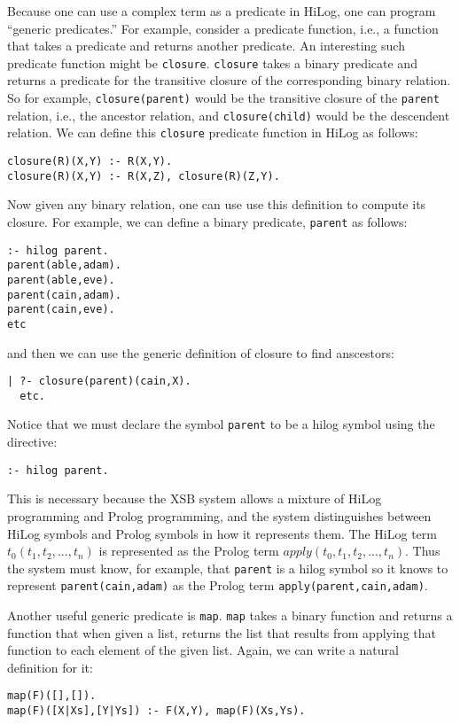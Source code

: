 Because one can use a complex term as a predicate in HiLog, one can
program ``generic predicates.''  For example, consider a predicate
function, i.e., a function that takes a predicate and returns another
predicate.  An interesting such predicate function might be
\verb|closure|.  \verb|closure| takes a binary predicate and returns a
predicate for the transitive closure of the corresponding binary
relation.  So for example, \verb|closure(parent)| would be the
transitive closure of the \verb|parent| relation, i.e., the ancestor
relation, and \verb|closure(child)| would be the descendent relation.
We can define this \verb|closure| predicate function in HiLog as
follows:
\begin{verbatim}
closure(R)(X,Y) :- R(X,Y).
closure(R)(X,Y) :- R(X,Z), closure(R)(Z,Y).
\end{verbatim}
Now given any binary relation, one can use use this definition to
compute its closure.  For example, we can define a binary predicate,
\verb|parent| as follows:
\begin{verbatim}
:- hilog parent.
parent(able,adam).
parent(able,eve).
parent(cain,adam).
parent(cain,eve).
etc
\end{verbatim}
and then we can use the generic definition of closure to find
anscestors:
\begin{verbatim}
| ?- closure(parent)(cain,X).
  etc.
\end{verbatim}

Notice that we must declare the symbol \verb|parent| to be a hilog
symbol using the directive:
\begin{verbatim}
:- hilog parent.
\end{verbatim}
This is necessary because the XSB system allows a mixture of HiLog
programming and Prolog programming, and the system distinguishes
between HiLog symbols and Prolog symbols in how it represents them.
The HiLog term $t_0(t_1,t_2,...,t_n)$ is represented as the Prolog
term $apply(t_0,t_1,t_2,...,t_n)$.  Thus the system must know, for
example, that \verb|parent| is a hilog symbol so it knows to represent
\verb|parent(cain,adam)| 
as the Prolog term
\verb|apply(parent,cain,adam)|.

Another useful generic predicate is \verb|map|.  \verb|map| takes a
binary function and returns a function that when given a list, returns
the list that results from applying that function to each element of
the given list.  Again, we can write a natural definition for it:
\begin{verbatim}
map(F)([],[]).
map(F)([X|Xs],[Y|Ys]) :- F(X,Y), map(F)(Xs,Ys).
\end{verbatim}

